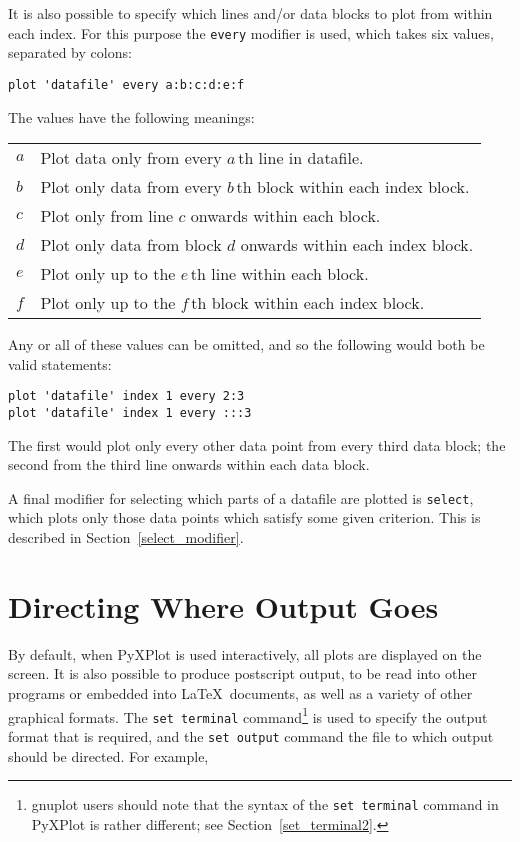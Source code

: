 It is also possible to specify which lines and/or data blocks to plot from
within each index. For this purpose the \texttt{every} modifier is used, which
takes six values, separated by colons:

\begin{verbatim}
plot 'datafile' every a:b:c:d:e:f
\end{verbatim}

The values have the following meanings:

\begin{longtable}{p{1.0cm}p{10.5cm}}
$a$ & Plot data only from every $a\,$th line in datafile. \\
$b$ & Plot only data from every $b\,$th block within each index block. \\
$c$ & Plot only from line $c$ onwards within each block. \\
$d$ & Plot only data from block $d$ onwards within each index block. \\
$e$ & Plot only up to the $e\,$th line within each block. \\
$f$ & Plot only up to the $f\,$th block within each index block. \\
\end{longtable}

\noindent Any or all of these values can be omitted, and so the following would
both be valid statements:

\begin{verbatim}
plot 'datafile' index 1 every 2:3
plot 'datafile' index 1 every :::3
\end{verbatim}

\noindent The first would plot only every other data point from every third
data block; the second from the third line onwards within each data block.

A final modifier for selecting which parts of a datafile are plotted is
\texttt{select}, which plots only those data points which satisfy some given
criterion. This is 
described in Section~\ref{select_modifier}.

\section{Directing Where Output Goes}
\label{directing_output}

By default, when PyXPlot is used interactively, all plots are displayed on the
screen. It is also possible to produce postscript output, to be read into other
programs or embedded into \LaTeX\ documents, as well as a variety of other
graphical formats. The \texttt{set terminal} command\footnote{gnuplot users should note that
the syntax of the \texttt{set terminal} command in PyXPlot is rather different;
see Section~\ref{set_terminal2}.} is used to specify the output format that is
required, and the \texttt{set output} command the file to which output should be
directed. For example,

